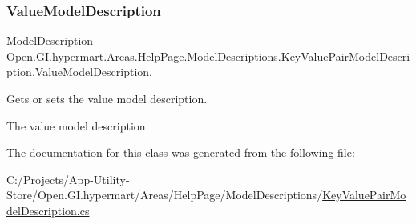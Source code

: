 \subsubsection{\texorpdfstring{Value\+Model\+Description}{ValueModelDescription}}
{\footnotesize\ttfamily \hyperlink{class_open_1_1_g_i_1_1hypermart_1_1_areas_1_1_help_page_1_1_model_descriptions_1_1_model_description}{Model\+Description} Open.\+G\+I.\+hypermart.\+Areas.\+Help\+Page.\+Model\+Descriptions.\+Key\+Value\+Pair\+Model\+Description.\+Value\+Model\+Description\hspace{0.3cm}{\ttfamily [get]}, {\ttfamily [set]}}



Gets or sets the value model description. 

The value model description. 

The documentation for this class was generated from the following file\+:\begin{DoxyCompactItemize}
\item 
C\+:/\+Projects/\+App-\/\+Utility-\/\+Store/\+Open.\+G\+I.\+hypermart/\+Areas/\+Help\+Page/\+Model\+Descriptions/\hyperlink{_key_value_pair_model_description_8cs}{Key\+Value\+Pair\+Model\+Description.\+cs}\end{DoxyCompactItemize}
